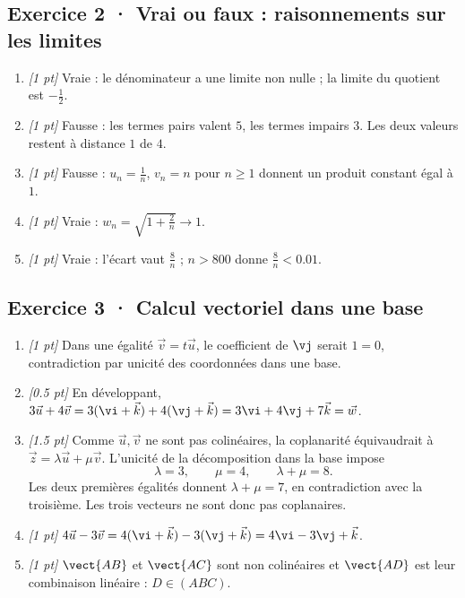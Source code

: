 \subsection*{Exercice 2 · Vrai ou faux : raisonnements sur les limites}\begin{enumerate}

\item \textit{[1 pt]} Vraie : le dénominateur a une limite non nulle ; la limite du quotient est $-\frac{1}{2}$.

\item \textit{[1 pt]} Fausse : les termes pairs valent $5$, les termes impairs $3$. Les deux valeurs restent à distance $1$ de $4$.

\item \textit{[1 pt]} Fausse : $u_n=\frac{1}{n}$, $v_n=n$ pour $n\ge1$ donnent un produit constant égal à $1$.

\item \textit{[1 pt]} Vraie : $w_n=\sqrt{1+\frac{2}{n}}\to1$.

\item \textit{[1 pt]} Vraie : l'écart vaut $\frac{8}{n}$ ; $n>800$ donne $\frac{8}{n}<\num{0,01}$.

\end{enumerate}

\subsection*{Exercice 3 · Calcul vectoriel dans une base}\begin{enumerate}

\item \textit{[1 pt]} Dans une égalité $\vec v=t\vec u$, le coefficient de $\vj $ serait $1=0$, contradiction par unicité des coordonnées dans une base.

\item \textit{[\num{0,5} pt]} En développant, $3\vec u+4\vec v=3(\vi +\vec k)+4(\vj +\vec k)=3\vi +4\vj +7\vec k=\vec w$.

\item \textit{[\num{1,5} pt]} Comme $\vec u,\vec v$ ne sont pas colinéaires, la coplanarité équivaudrait à $\vec z=\lambda\vec u+\mu\vec v$. L'unicité de la décomposition dans la base impose
\[\lambda=3,\qquad\mu=4,\qquad\lambda+\mu=8.\]
Les deux premières égalités donnent $\lambda+\mu=7$, en contradiction avec la troisième. Les trois vecteurs ne sont donc pas coplanaires.

\item \textit{[1 pt]} $4\vec u-3\vec v=4(\vi +\vec k)-3(\vj +\vec k)=4\vi -3\vj +\vec k$.

\item \textit{[1 pt]} $\vect{AB}$ et $\vect{AC}$ sont non colinéaires et $\vect{AD}$ est leur combinaison linéaire : $D\in(ABC)$.

\end{enumerate}


